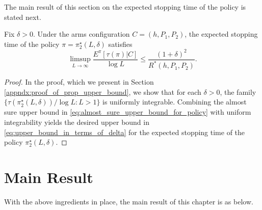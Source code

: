 The main result of this section on the expected stopping time of the policy is stated next.
\begin{prop}
	\label{prop:upper_bound}
	Fix $\delta>0$. Under the arms configuration $C=(h, P_1, P_2)$, the expected stopping time of the policy $\pi=\pi_2^\star(L,\delta)$ satisfies
	\begin{equation}
		\limsup\limits_{L \to \infty} \frac{E^\pi[\tau(\pi)|C]}{\log L} \leq \frac{(1+\delta)^2}{R^*(h, P_1, P_2)}.
	\label{eq:upper_bound_in_terms_of_delta}
	\end{equation}
\end{prop}
\begin{proof}
	In the proof, which we present in Section \ref{appndx:proof_of_prop_upper_bound}, we show that for each $\delta>0$, the family $\{\tau(\pi_2^\star(L,\delta))/\log L:L>1\}$ is uniformly integrable. Combining the almost sure upper bound in \eqref{eq:almost_sure_upper_bound_for_policy} with uniform integrability yields the desired upper bound in \eqref{eq:upper_bound_in_terms_of_delta} for the expected stopping time of the policy $\pi_2^\star(L, \delta)$.
\end{proof}


\section{Main Result}\label{sec:main_result}
With the above ingredients in place, the main result of this chapter is as below.

